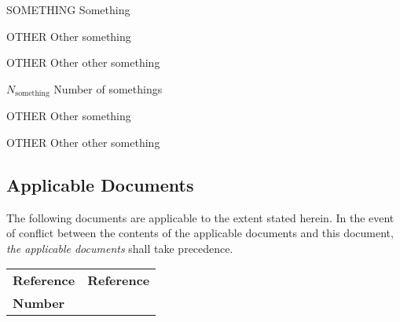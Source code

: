 \documentclass[11pt,a4paper]{article}
\begin{document}
\sdpfrontpage

\sdptableofcontents

\sdplistofabbreviations
\begin{basedescript}{\desclabelstyle{\pushlabel}\desclabelwidth{6em}}
    \item[SOMETHING] Something \vspace{-0.2cm}
    \item[OTHER] Other something \vspace{-0.2cm}
    \item[OTHER] Other other something \vspace{-0.2cm}
\end{basedescript} 

\sdplistofsymbols
\begin{basedescript}{\desclabelstyle{\pushlabel}\desclabelwidth{6em}}
    \item[$N_\mathrm{something}$] Number of somethings \vspace{-0.2cm}
    \item[OTHER] Other something \vspace{-0.2cm}
    \item[OTHER] Other other something \vspace{-0.2cm}
\end{basedescript} 


\sdplistoffigures

\sdplistoftables

\sdpsummary

\sdpreferencedocs

\subsection*{Applicable Documents}

The following documents are applicable to the extent stated herein. In the
event of conflict between the contents of the applicable documents and this
document, \emph{the applicable documents} shall take precedence.

\begin{center}{
\begin{tabularx}{\textwidth}{|X|X|}
    \hline
    \bf{Reference} & \bf{Reference}\\
    \bf{Number} & \\
    \hline
\end{tabularx}}
\end{center}
\end{document}
